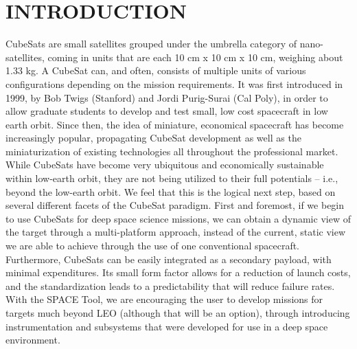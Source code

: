 \documentclass[a4, 12 pt]{article} %
\begin{document}
\section{INTRODUCTION}
CubeSats are small satellites grouped under the umbrella category of nano-satellites, coming in units that are each 10 cm x 10 cm x 10 cm, weighing about 1.33 kg. A CubeSat can, and often, consists of multiple units of various configurations depending on the mission requirements. It was first introduced in 1999, by Bob Twigs (Stanford) and Jordi Purig-Surai (Cal Poly), in order to allow graduate students to develop and test small, low cost spacecraft in low earth orbit. Since then, the idea of miniature, economical spacecraft has become increasingly popular, propagating CubeSat development as well as the miniaturization of existing technologies all throughout the professional market.  \\[3mm]
While CubeSats have become very ubiquitous and economically sustainable within low-earth orbit, they are not being utilized to their full potentials -- i.e., beyond the low-earth orbit. We feel that this is the logical next step, based on several different facets of the CubeSat paradigm. First and foremost, if we begin to use CubeSats for deep space science missions, we can obtain a dynamic view of the target through a multi-platform approach, instead of the current, static view we are able to achieve through the use of one conventional spacecraft. Furthermore,  CubeSats can be easily integrated as a secondary payload, with minimal expenditures. Its small form factor allows for a reduction of launch costs, and the standardization leads to a predictability that will reduce failure rates. With the SPACE Tool, we are encouraging the user to develop missions for targets much beyond LEO (although that will be an option), through introducing instrumentation and subsystems that were developed for use in a deep space environment.
\end{document}
